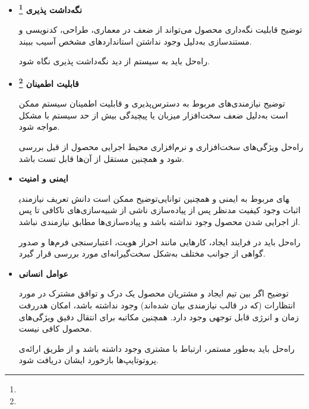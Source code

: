 \begin{itemize}
	
	\item 
	\textbf{نگه‌داشت پذیری \footnote{}}

	توضیح \hspace*{1cm} 
قابلیت نگه‌داری محصول می‌تواند از ضعف در معماری، طراحی، کدنویسی و مستندسازی به‌دلیل وجود نداشتن استانداردهای مشخص آسیب ببیند.
	
	راه‌حل \hspace*{1cm} 
باید به سیستم از دید نگه‌داشت پذیری نگاه شود.
		
	\item 
	\textbf{قابلیت اطمینان \footnote{}}

	توضیح \hspace*{1cm} 
نیازمندی‌های مربوط به دسترس‌پذیری و قابلیت اطمینان سیستم ممکن است به‌دلیل ضعف سخت‌افزار میزبان یا پیچیدگی بیش از حد سیستم با مشکل مواجه شود.
	
	راه‌حل \hspace*{1cm} 
ویژگی‌های سخت‌افزاری و نرم‌افزاری محیط اجرایی محصول از قبل بررسی شود و همچنین مستقل از آن‌ها قابل تست باشد.
		
	\item 
	\textbf{ایمنی و امنیت}

	توضیح \hspace*{1cm} 
ممکن است دانش تعریف نیازمندی‎های مربوط به ایمنی و همچنین توانایی اثبات وجود کیفیت مدنظر پس از پیاده‌سازی ناشی از شبیه‌سازی‌های ناکافی تا پس از اجرایی شدن محصول وجود نداشته باشد و پیاده‌سازی‌ها مطابق نیازمندی نباشد.
	
	راه‌حل \hspace*{1cm} 
باید در فرایند ایجاد، کارهایی مانند احراز هویت، اعتبارسنجی فرم‌ها و صدور گواهی از جوانب مختلف به‌شکل سخت‌گیرانه‌ای مورد بررسی قرار گیرد.
		
	\item 
	\textbf{عوامل انسانی}

	توضیح \hspace*{1cm} 
اگر بین تیم ایجاد و مشتریان محصول یک درک و توافق مشترک در مورد انتظارات (که در قالب نیازمندی بیان شده‌اند) وجود نداشته باشد، امکان هدررفت زمان و انرژی قابل توجهی وجود دارد. همچنین مکاتبه برای انتقال دقیق ویژگی‌های محصول کافی نیست.
	
	راه‌حل \hspace*{1cm} 
باید به‌طور مستمر، ارتباط با مشتری وجود داشته باشد و از طریق ارائه‌ی پروتوتایپ‌ها بازخورد ایشان دریافت شود.
				
\end{itemize}

